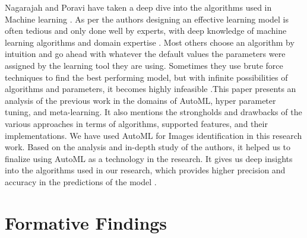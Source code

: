 \documentclass[10pt,conference]{IEEEtran}
\begin{document}
{\newline
\newline
Nagarajah and Poravi \cite{sardogan2018plant} have taken a deep dive into the algorithms used in Machine learning . As per the authors designing an effective learning model is often tedious and only done well by experts, with deep knowledge of machine learning algorithms and domain expertise \cite{militante2019plant}. Most others choose an algorithm by intuition and go ahead with whatever the default values the parameters were assigned by the learning tool they are using. Sometimes they use brute force techniques to find the best performing model, but with infinite possibilities of algorithms and parameters, it becomes highly infeasible \cite{yan2016building}.This paper presents an analysis of the previous work in the domains of AutoML, hyper parameter tuning, and meta-learning. It also mentions the strongholds and drawbacks of the various approaches in terms of algorithms, supported features, and their implementations. We have used AutoML for Images identification in this research work. Based on the analysis and in-depth study of the authors, it helped us to finalize using AutoML as a technology in the research. It gives us deep insights into the algorithms used in our research, which provides higher precision and accuracy in the predictions of the model \cite{maldonado2019natural}.
}


	\section{Formative Findings}
\end{document}
